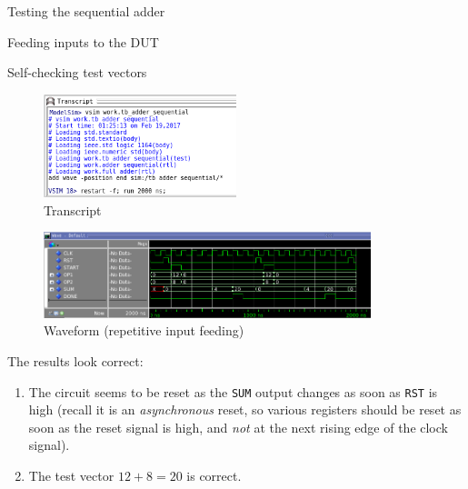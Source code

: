 \documentclass[lab]{course}
\begin{document}
\begin{section}{Testing the sequential adder}
\begin{subsection}{Feeding inputs to the DUT}
\begin{subsubsection}{Self-checking test vectors}
\begin{enumerate}
                \begin{figure}[!h]
                    \begin{centering}
                        \includegraphics[width=0.5\textwidth]{figs/waveform_sequential_transcript_basic_version.png}
                        \caption{Transcript}
                        \label{fig:waveform_sequential_transcript_basic_version}
                    \end{centering}
                \end{figure}

                \begin{figure}[!h]
                    \begin{centering}
                        \includegraphics[width=0.85\textwidth]{figs/waveform_sequential_process_reexecutes.png}
                        \caption{Waveform (repetitive input feeding)}
                        \label{fig:waveform_sequential_process_reexecutes}
                    \end{centering}
                \end{figure}

                The results look correct:

                \begin{enumerate}
                    \item The circuit seems to be reset as the \verb+SUM+ output changes as soon as \verb+RST+ is high (recall it is an \emph{asynchronous} reset, so various registers should be reset as soon as the reset signal is high, and \emph{not} at the next rising edge of the clock signal).

                    \item The test vector $12 + 8 = 20$ is correct.
                \end{enumerate}


\end{enumerate}
\end{subsubsection}
\end{subsection}
\end{section}
\end{document}
